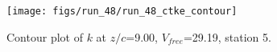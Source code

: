 \begin{figure}[H]
\centering
\texttt{[image: figs/run\_48/run\_48\_ctke\_contour]}
\caption{Contour plot of $k$ at $z/c$=9.00, $V_{free}$=29.19, station 5.}
\end{figure}


